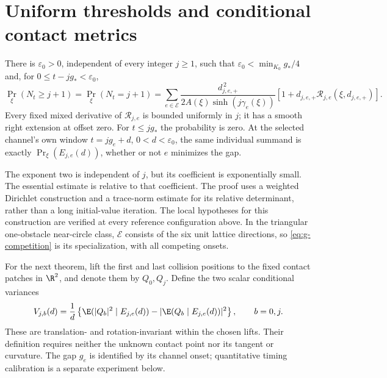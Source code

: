 \section{Uniform thresholds and conditional contact metrics}\label{sec:v8-finite-results}
\begin{theorem}
\label{thm:g-stability}
There is $\varepsilon_0>0$, independent of every integer $j\ge1$, such
that $\varepsilon_0<\min_{K_0}g_*/4$ and, for
$0\le t-jg_*<\varepsilon_0$,
\begin{equation}\label{eq:g-competition}
 \Pr_\xi(N_t\ge j+1)=\Pr_\xi(N_t=j+1)
 =\sum_{e\in\mathcal E}
 \frac{d_{j,e,+}^{\,2}}{2A(\xi)\sinh(j\gamma_e(\xi))}
       [1+d_{j,e,+}\mathcal R_{j,e}(\xi,d_{j,e,+})].
\end{equation}
Every fixed mixed derivative of $\mathcal R_{j,e}$ is bounded uniformly
in $j$; it has a smooth right extension at offset zero. For $t\le jg_*$
the probability is zero. At the selected channel's own window
$t=jg_e+d$, $0<d<\varepsilon_0$, the same individual summand is exactly
$\Pr_\xi(E_{j,e}(d))$, whether or not $e$ minimizes the gap.
\end{theorem}

The exponent two is independent of $j$, but its coefficient is
exponentially small. The essential estimate is relative to that
coefficient. The proof uses a weighted Dirichlet construction and a
trace-norm estimate for its relative determinant, rather than a
long initial-value iteration. The local hypotheses for this construction
are verified at every reference configuration above. In the triangular
one-obstacle near-circle class, $\mathcal E$ consists of the six unit
lattice directions, so \eqref{eq:g-competition} is its specialization, with all competing onsets.

For the next theorem, lift the first and last collision positions to
the fixed contact patches in $\R^2$, and denote them by $Q_0,Q_j$.
Define the two scalar conditional variances
\begin{equation}\label{eq:v3-observed-variance}
 V_{j,b}(d)=\frac1d\left\{
 \E(|Q_b|^2\mid E_{j,e}(d))-
       |\E(Q_b\mid E_{j,e}(d))|^2\right\},\qquad b=0,j.
\end{equation}
These are translation- and rotation-invariant within the chosen lifts.
Their definition requires neither the unknown contact point nor its
tangent or curvature. The gap $g_e$ is identified by its channel onset; quantitative timing
calibration is a separate experiment below.


